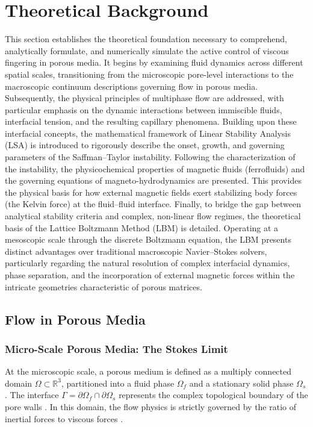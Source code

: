 \section{Theoretical Background}

This section establishes the theoretical foundation necessary to comprehend, analytically formulate, and numerically simulate the active control of viscous fingering in porous media.
It begins by examining fluid dynamics across different spatial scales, transitioning from the microscopic pore-level interactions to the macroscopic continuum descriptions governing flow in porous media.
Subsequently, the physical principles of multiphase flow are addressed, with particular emphasis on the dynamic interactions between immiscible fluids, interfacial tension, and the resulting capillary phenomena.
Building upon these interfacial concepts, the mathematical framework of Linear Stability Analysis (LSA) is introduced to rigorously describe the onset, growth, and governing parameters of the Saffman--Taylor instability.
Following the characterization of the instability, the physicochemical properties of magnetic fluids (ferrofluids) and the governing equations of magneto-hydrodynamics are presented.
This provides the physical basis for how external magnetic fields exert stabilizing body forces (the Kelvin force) at the fluid--fluid interface.
Finally, to bridge the gap between analytical stability criteria and complex, non-linear flow regimes, the theoretical basis of the Lattice Boltzmann Method (LBM) is detailed.
Operating at a mesoscopic scale through the discrete Boltzmann equation, the LBM presents distinct advantages over traditional macroscopic Navier--Stokes solvers, particularly regarding the natural resolution of complex interfacial dynamics, phase separation, and the incorporation of external magnetic forces within the intricate geometries characteristic of porous matrices.

\subsection{Flow in Porous Media}

\subsubsection{Micro-Scale Porous Media: The Stokes Limit}

At the microscopic scale, a porous medium is defined as a multiply connected domain $\Omega \subset \mathbb{R}^3$, partitioned into a fluid phase $\Omega_f$ and a stationary solid phase $\Omega_s$.
The interface $\Gamma = \partial \Omega_f \cap \partial \Omega_s$ represents the complex topological boundary of the pore walls \cite{whitaker1999method}.
In this domain, the flow physics is strictly governed by the ratio of inertial forces to viscous forces \cite{batchelor1967introduction}.

